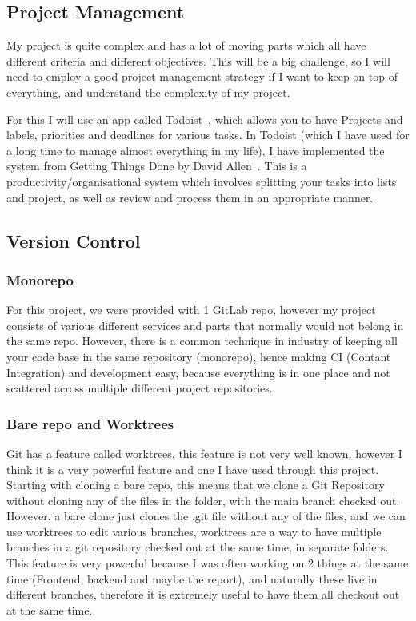 \documentclass[titlepage]{article}
\begin{document}
\subsection{Project Management}
My project is quite complex and has a lot of moving parts which all have different criteria and different objectives. This will be a big challenge, so I will need to employ a good project management strategy if I want to keep on top of everything, and understand the complexity of my project.

For this I will use an app called Todoist~\cite{todoist}, which allows you to have Projects and labels, priorities and deadlines for various tasks. In Todoist (which I have used for a long time to manage almost everything in my life), I have implemented the system from Getting Things Done by David Allen~\cite{gtd}. This is a productivity/organisational system which involves splitting your tasks into lists and project, as well as review and process them in an appropriate manner.

\subsection{Version Control}

\subsubsection{Monorepo}
For this project, we were provided with 1 GitLab repo, however my project consists of various different services and parts that normally would not belong in the same repo. However, there is a common technique in industry of keeping all your code base in the same repository (monorepo), hence making CI (Contant Integration) and development easy, because everything is in one place and not scattered across multiple different project repositories. 

\subsubsection{Bare repo and Worktrees}
Git has a feature called worktrees, this feature is not very well known, however I think it is a very powerful feature and one I have used through this project. Starting with cloning a bare repo, this means that we clone a Git Repository without cloning any of the files in the folder, with the main branch checked out. However, a bare clone just clones the .git file without any of the files, and we can use worktrees to edit various branches, worktrees are a way to have multiple branches in a git repository checked out at the same time, in separate folders. This feature is very powerful because I was often working on 2 things at the same time (Frontend, backend and maybe the report), and naturally these live in different branches, therefore it is extremely useful to have them all checkout out at the same time. 
\end{document}
